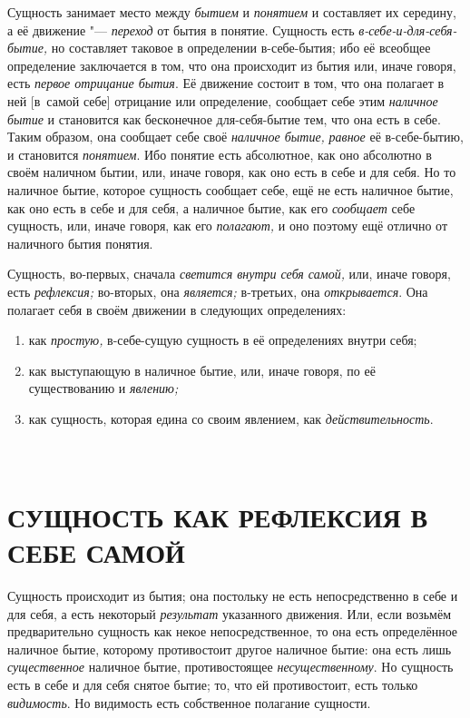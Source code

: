 Сущность занимает место между {\em бытием} и
{\em понятием} и составляет их середину, а её движение
"--- {\em переход} от бытия в понятие. Сущность есть
{\em в-себе-и-для-себя-бытие,} но составляет таковое в
определении в-себе-бытия; ибо её всеобщее определение заключается в том,
что она происходит из бытия или, иначе говоря, есть
{\em первое отрицание бытия}. Её движение состоит в
том, что она полагает в ней [в~самой себе] отрицание или определение,
сообщает себе этим {\em наличное бытие} и становится
как бесконечное для-себя-бытие тем, что она есть в себе. Таким образом, она
сообщает себе своё {\em наличное бытие,}
{\em равное} её в-себе-бытию, и становится
{\em понятием}. Ибо понятие есть абсолютное, как оно
абсолютно в своём наличном бытии, или, иначе говоря, как оно есть в себе и
для себя. Но то наличное бытие, которое сущность сообщает себе, ещё не есть
наличное бытие, как оно есть в себе и для себя, а наличное бытие, как его
{\em сообщает} себе сущность, или, иначе говоря, как
его {\em полагают,} и оно поэтому ещё отлично от
наличного бытия понятия.

Сущность, во-первых, сначала {\em светится внутри себя
самой,} или, иначе говоря, есть {\em рефлексия;}
во-вторых, она {\em является;} в-третьих, она
{\em открывается}. Она полагает себя в своём движении в
следующих определениях:
\begin{enumerate}[~~~~I.]
\item как {\em простую,} в-себе-сущую сущность в её определениях внутри себя;
\item как выступающую в наличное бытие, или, иначе
  говоря, по её существованию и {\em явлению;}
\item как сущность, которая едина со своим
  явлением, как {\em действительность}.
\end{enumerate}

\clearpage


\part[\small СУЩНОСТЬ КАК РЕФЛЕКСИЯ В СЕБЕ САМОЙ]%
     {\fontsize{9}{11}\selectfont{\mdseries ПЕРВЫЙ ОТДЕЛ}\\%
      \normalsize СУЩНОСТЬ КАК РЕФЛЕКСИЯ В СЕБЕ САМОЙ}

Сущность происходит из бытия; она постольку не
есть непосредственно в себе и для себя, а есть некоторый
{\em результат} указанного движения. Или, если возьмём
предварительно сущность как некое непосредственное, то она есть
определённое наличное бытие, которому противостоит другое наличное бытие:
она есть лишь {\em существенное} наличное бытие,
противостоящее {\em несущественному}. Но сущность есть
в себе и для себя снятое бытие; то, что ей противостоит, есть только
{\em видимость}. Но видимость есть собственное полагание сущности.


